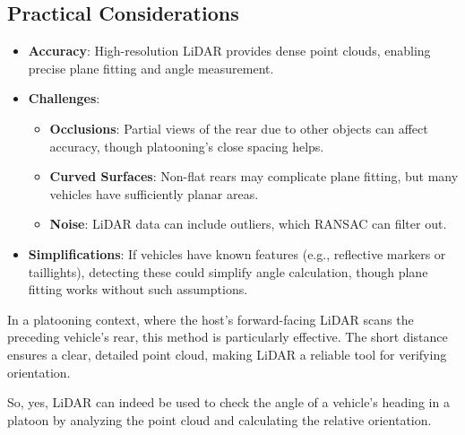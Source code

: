 \documentclass{article}
\begin{document}
\subsection*{Practical Considerations}
\begin{itemize}
    \item \textbf{Accuracy}: High-resolution LiDAR provides dense point clouds, enabling precise plane fitting and angle measurement.
    \item \textbf{Challenges}: 
    \begin{itemize}
        \item \textbf{Occlusions}: Partial views of the rear due to other objects can affect accuracy, though platooning's close spacing helps.
        \item \textbf{Curved Surfaces}: Non-flat rears may complicate plane fitting, but many vehicles have sufficiently planar areas.
        \item \textbf{Noise}: LiDAR data can include outliers, which RANSAC can filter out.
    \end{itemize}
    \item \textbf{Simplifications}: If vehicles have known features (e.g., reflective markers or taillights), detecting these could simplify angle calculation, though plane fitting works without such assumptions.
\end{itemize}

In a platooning context, where the host's forward-facing LiDAR scans the preceding vehicle's rear, this method is particularly effective. The short distance ensures a clear, detailed point cloud, making LiDAR a reliable tool for verifying orientation.

So, yes, LiDAR can indeed be used to check the angle of a vehicle's heading in a platoon by analyzing the point cloud and calculating the relative orientation.
\end{document}
